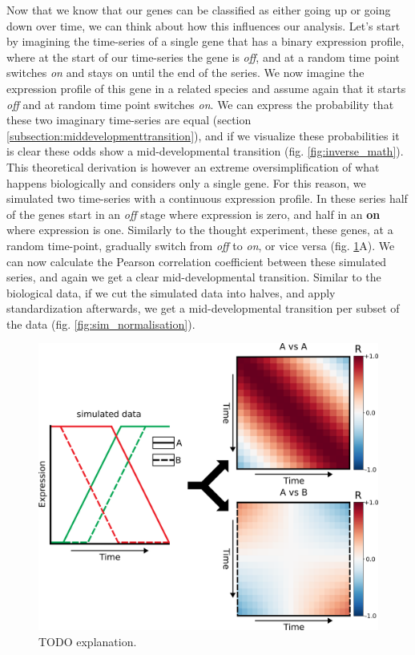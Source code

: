 Now that we know that our genes can be classified as either going up or going down over time, we can think about how this influences our analysis. Let's start by imagining the time-series of a single gene that has a binary expression profile, where at the start of our time-series the gene is \textit{off}, and at a random time point switches \textit{on} and stays on until the end of the series. We now imagine the expression profile of this gene in a related species and assume again that it starts \textit{off} and at random time point switches \textit{on}. We can express the probability that these two imaginary time-series are equal (section \ref{subsection:middevelopmenttransition}), and if we visualize these probabilities it is clear these odds show a mid-developmental transition (fig. \ref{fig:inverse_math}). This theoretical derivation is however an extreme oversimplification of what happens biologically and considers only a single gene. For this reason, we simulated two time-series with a continuous expression profile. In these series half of the genes start in an \textit{off} stage where expression is zero, and half in an \textbf{on} where expression is one. Similarly to the thought experiment, these genes, at a random time-point, gradually switch from \textit{off} to \textit{on}, or vice versa (fig. \ref{fig:sim_explanation}A). We can now calculate the Pearson correlation coefficient between these simulated series, and again we get a clear mid-developmental transition. Similar to the biological data, if we cut the simulated data into halves, and apply standardization afterwards, we get a mid-developmental transition per subset of the data (fig. \ref{fig:sim_normalisation}). 

\begin{figure}[H]
    \includegraphics[width=\linewidth]{ch4.hourglass/images/sim_explanation.png}
    \caption{TODO explanation.}
    \label{fig:sim_explanation}
\end{figure}

